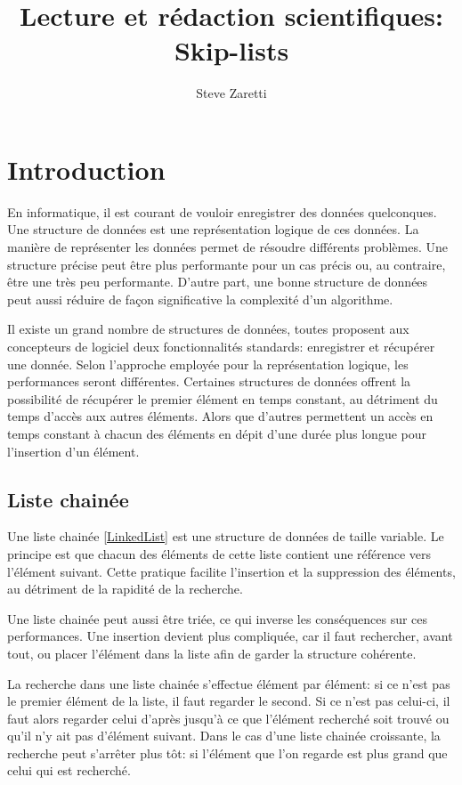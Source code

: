 \documentclass[hidelinks,a4paper, 12pt]{article}
\title{Lecture et rédaction scientifiques: \\Skip-lists }
\author{Steve Zaretti}
\begin{document}
	
	\maketitle
	\newpage
	\tableofcontents
	\newpage
	
	\section{Introduction}
	En informatique, il est courant de vouloir enregistrer des données quelconques. Une structure de données est une représentation logique de ces données. La manière de représenter les données permet de résoudre  différents problèmes. Une structure précise peut être plus performante pour un cas précis ou, au contraire, être une très peu performante. D'autre part, une bonne structure de données peut aussi réduire de façon significative la complexité d'un algorithme.
	
	Il existe un grand nombre de structures de données, toutes proposent aux concepteurs de logiciel deux fonctionnalités standards: enregistrer et récupérer une donnée. Selon l'approche employée pour la représentation logique, les performances seront différentes. Certaines structures de données offrent la possibilité de récupérer le premier élément en temps constant, au détriment du temps d'accès aux autres éléments. Alors que d'autres permettent un accès en temps constant à chacun des éléments en dépit d'une durée plus longue pour l'insertion d'un élément.
	
	\subsection{Liste chainée}
	Une liste chainée \cref{LinkedList} est une structure de données de taille variable. Le principe est que chacun des éléments de cette liste contient une référence vers l'élément suivant. Cette pratique facilite l'insertion et la suppression des éléments, au détriment de la rapidité de la recherche.
	
	Une liste chainée peut aussi être triée, ce qui inverse les conséquences sur ces performances. Une insertion devient plus compliquée, car il faut rechercher, avant tout, ou placer l'élément dans la liste afin de garder la structure cohérente.
	
	La recherche dans une liste chainée s'effectue élément par élément: si ce n'est pas le premier élément de la liste, il faut regarder le second. Si ce n'est pas celui-ci, il faut alors regarder celui d'après jusqu'à ce que l'élément recherché soit trouvé ou qu'il n'y ait pas d'élément suivant. Dans le cas d'une liste chainée croissante, la recherche peut s'arrêter plus tôt: si l'élément que l'on regarde est plus grand que celui qui est recherché.
	
\end{document}
